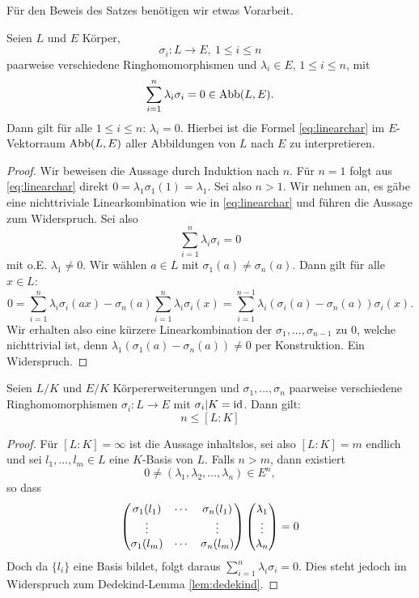 \documentclass{book}
\begin{document}
Für den Beweis des Satzes benötigen wir etwas Vorarbeit.

\begin{lem}
    \label{lem:dedekind}
    Seien $L$ und $E$ Körper, 
    \[
        \sigma_i: L \to E, \ 1 \le i \le n
    \]
    paarweise verschiedene Ringhomomorphismen und $\lambda_i \in E$, $1 \le i \le n$, mit
    \begin{equation}
        \label{eq:linearchar}
        \sum_{i=1}^n \lambda_i \sigma_i = 0 \in \operatorname{Abb}(L,E).
    \end{equation}
    Dann gilt für alle $1 \le i \le n$: $\lambda_i = 0$. Hierbei ist die Formel
    \eqref{eq:linearchar} im $E$-Vektorraum $\operatorname{Abb}(L,E)$ aller Abbildungen von
    $L$ nach $E$ zu interpretieren.
\end{lem}
\begin{proof}
    Wir beweisen die Aussage durch Induktion nach $n$. Für $n =1$ folgt aus
    \eqref{eq:linearchar} direkt $0 = \lambda_1 \sigma_1(1) = \lambda_1$. Sei
    also $n >1$. Wir nehmen an, es gäbe eine nichttriviale Linearkombination
    wie in \eqref{eq:linearchar} und führen die Aussage zum Widerspruch. Sei also 
    \[
        \sum_{i=1}^n \lambda_i \sigma_i = 0
    \]
    mit o.E. $\lambda_1 \ne 0$. Wir wählen $a \in L$ mit $\sigma_1(a) \ne
    \sigma_n(a)$. Dann gilt für alle $x \in L$:
    \[
        0 = \sum_{i=1}^n \lambda_i \sigma_i(ax) - \sigma_n(a) \sum_{i=1}^n
        \lambda_i \sigma_i(x) = \sum_{i=1}^{n-1} \lambda_i(\sigma_i(a) -
        \sigma_n(a)) \sigma_i(x).
    \]
    Wir erhalten also eine kürzere Linearkombination der $\sigma_1, ..., \sigma_{n-1}$ zu
    $0$, welche nichttrivial ist, denn $\lambda_1(\sigma_1(a) - \sigma_n(a))
    \ne 0$ per Konstruktion. Ein Widerspruch.
\end{proof}

\begin{thm}
    \label{thm:dedekind}
    Seien $L/K$ und $E/K$ Körpererweiterungen und $\sigma_1, ..., \sigma_n$
    paarweise verschiedene Ringhomomorphismen $\sigma_i: L \to E$ mit
    $\sigma_i|K = \operatorname{id}$. Dann gilt:
    \[
        n \le [L:K]
    \]
\end{thm}
\begin{proof}
    Für $[L:K] = \infty$ ist die Aussage inhaltslos, sei also $[L:K] =m$
    endlich und sei $l_1, ..., l_m \in L$ eine $K$-Basis von $L$. Falls $n > m$, dann existiert 
    \[
        0 \ne (\lambda_1, \lambda_2, ..., \lambda_n) \in E^n,
    \]
    so dass
    \[
        \begin{pmatrix}  \sigma_1(l_1) & \cdots & \sigma_n(l_1)\\ \vdots & & \vdots \\ \sigma_1(l_m) & \cdots & \sigma_n(l_m)  \end{pmatrix} \begin{pmatrix}  \lambda_1 \\ \vdots \\ \lambda_n  \end{pmatrix} = 0
    \]
    Doch da $\{l_i\}$ eine Basis bildet, folgt daraus $\sum_{i=1}^n \lambda_i
    \sigma_i = 0$. Dies steht jedoch im Widerspruch zum Dedekind-Lemma
    \ref{lem:dedekind}.
\end{proof}
\end{document}
